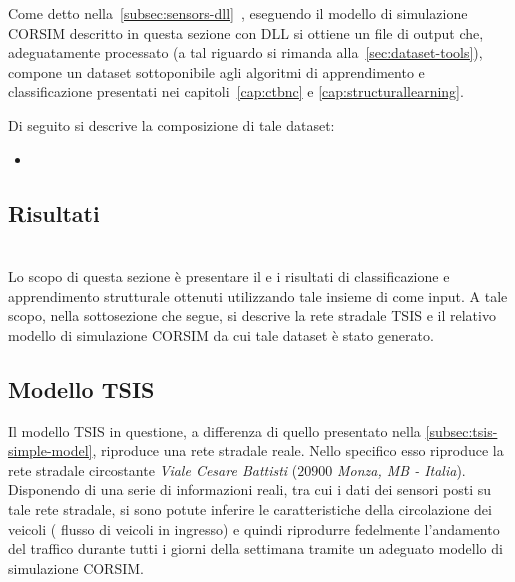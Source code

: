 Come detto nella~\autoref{subsec:sensors-dll}~, eseguendo il modello di simulazione \acs{CORSIM} descritto in questa sezione con  \acs{DLL} si ottiene un file di output che, adeguatamente processato (a tal riguardo si rimanda alla~\vref{sec:dataset-tools}), compone un dataset sottoponibile agli algoritmi di apprendimento e classificazione presentati nei capitoli~\ref{cap:ctbnc} e \ref{cap:structurallearning}.

Di seguito si descrive la composizione di tale dataset:
\begin{itemize}
	\item 
\end{itemize}

\subsection{Risultati}

\section{}\label{sec:dataset-2}
Lo scopo di questa sezione è presentare il  e i risultati di classificazione e apprendimento strutturale ottenuti utilizzando tale insieme di \emph{} come input. A tale scopo, nella sottosezione che segue, si descrive la rete stradale \acs{TSIS} e il relativo modello di simulazione \acs{CORSIM} da cui tale dataset è stato generato.

\subsection{Modello TSIS}\label{subsec:tsis-monza-model}
Il modello \acs{TSIS} in questione, a differenza di quello presentato nella \autoref{subsec:tsis-simple-model}, riproduce una rete stradale reale. Nello specifico esso riproduce la rete stradale circostante \emph{Viale Cesare Battisti} ($20900$ \emph{Monza, MB - Italia}). Disponendo di una serie di informazioni reali, tra cui i dati dei sensori posti su tale rete stradale, si sono potute inferire le caratteristiche della circolazione dei veicoli (\eg{} flusso di veicoli in ingresso) e quindi riprodurre fedelmente l'andamento del traffico durante tutti i giorni della settimana tramite un adeguato modello di simulazione \acs{CORSIM}.

